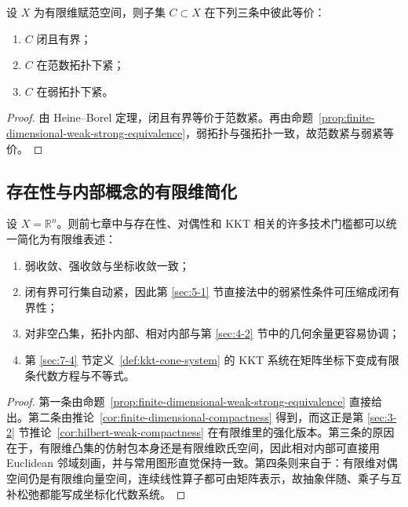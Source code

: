 \begin{corollary}[有限维中的闭有界紧性]\label{cor:finite-dimensional-compactness}
设 $X$ 为有限维赋范空间，则子集 $C\subset X$ 在下列三条中彼此等价：
\begin{enumerate}
  \item $C$ 闭且有界；
  \item $C$ 在范数拓扑下紧；
  \item $C$ 在弱拓扑下紧。
\end{enumerate}
\end{corollary}

\begin{proof}
由 Heine--Borel 定理，闭且有界等价于范数紧。再由命题~\ref{prop:finite-dimensional-weak-strong-equivalence}，弱拓扑与强拓扑一致，故范数紧与弱紧等价。
\end{proof}

\subsection{存在性与内部概念的有限维简化}

\begin{theorem}[有限维塌缩原则]\label{thm:finite-dimensional-collapse-principle}
设 $X=\mathbb R^n$。则前七章中与存在性、对偶性和 KKT 相关的许多技术门槛都可以统一简化为有限维表述：
\begin{enumerate}
  \item 弱收敛、强收敛与坐标收敛一致；
  \item 闭有界可行集自动紧，因此第 \ref{sec:5-1} 节直接法中的弱紧性条件可压缩成闭有界性；
  \item 对非空凸集，拓扑内部、相对内部与第 \ref{sec:4-2} 节中的几何余量更容易协调；
  \item 第 \ref{sec:7-4} 节定义~\ref{def:kkt-cone-system} 的 KKT 系统在矩阵坐标下变成有限条代数方程与不等式。
\end{enumerate}
\end{theorem}

\begin{proof}
第一条由命题~\ref{prop:finite-dimensional-weak-strong-equivalence} 直接给出。第二条由推论~\ref{cor:finite-dimensional-compactness} 得到，而这正是第 \ref{sec:3-2} 节推论~\ref{cor:hilbert-weak-compactness} 在有限维里的强化版本。第三条的原因在于，有限维凸集的仿射包本身还是有限维欧氏空间，因此相对内部可直接用 Euclidean 邻域刻画，并与常用图形直觉保持一致。第四条则来自于：有限维对偶空间仍是有限维向量空间，连续线性算子都可由矩阵表示，故抽象伴随、乘子与互补松弛都能写成坐标化代数系统。
\end{proof}

